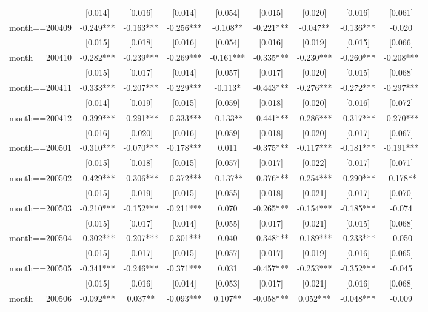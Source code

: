 \documentclass[]{article}
\begin{document}
\begin{tabular}{lcccccccc}
 & [0.014] & [0.016] & [0.014] & [0.054] & [0.015] & [0.020] & [0.016] & [0.061] \\
month==200409 & -0.249*** & -0.163*** & -0.256*** & -0.108** & -0.221*** & -0.047** & -0.136*** & -0.020 \\
 & [0.015] & [0.018] & [0.016] & [0.054] & [0.016] & [0.019] & [0.015] & [0.066] \\
month==200410 & -0.282*** & -0.239*** & -0.269*** & -0.161*** & -0.335*** & -0.230*** & -0.260*** & -0.208*** \\
 & [0.015] & [0.017] & [0.014] & [0.057] & [0.017] & [0.020] & [0.015] & [0.068] \\
month==200411 & -0.333*** & -0.207*** & -0.229*** & -0.113* & -0.443*** & -0.276*** & -0.272*** & -0.297*** \\
 & [0.014] & [0.019] & [0.015] & [0.059] & [0.018] & [0.020] & [0.016] & [0.072] \\
month==200412 & -0.399*** & -0.291*** & -0.333*** & -0.133** & -0.441*** & -0.286*** & -0.317*** & -0.270*** \\
 & [0.016] & [0.020] & [0.016] & [0.059] & [0.018] & [0.020] & [0.017] & [0.067] \\
month==200501 & -0.310*** & -0.070*** & -0.178*** & 0.011 & -0.375*** & -0.117*** & -0.181*** & -0.191*** \\
 & [0.015] & [0.018] & [0.015] & [0.057] & [0.017] & [0.022] & [0.017] & [0.071] \\
month==200502 & -0.429*** & -0.306*** & -0.372*** & -0.137** & -0.376*** & -0.254*** & -0.290*** & -0.178** \\
 & [0.015] & [0.019] & [0.015] & [0.055] & [0.018] & [0.021] & [0.017] & [0.070] \\
month==200503 & -0.210*** & -0.152*** & -0.211*** & 0.070 & -0.265*** & -0.154*** & -0.185*** & -0.074 \\
 & [0.015] & [0.017] & [0.014] & [0.055] & [0.017] & [0.021] & [0.015] & [0.068] \\
month==200504 & -0.302*** & -0.207*** & -0.301*** & 0.040 & -0.348*** & -0.189*** & -0.233*** & -0.050 \\
 & [0.015] & [0.017] & [0.015] & [0.057] & [0.017] & [0.019] & [0.016] & [0.065] \\
month==200505 & -0.341*** & -0.246*** & -0.371*** & 0.031 & -0.457*** & -0.253*** & -0.352*** & -0.045 \\
 & [0.015] & [0.016] & [0.014] & [0.053] & [0.017] & [0.021] & [0.016] & [0.068] \\
month==200506 & -0.092*** & 0.037** & -0.093*** & 0.107** & -0.058*** & 0.052*** & -0.048*** & -0.009 \\

\end{tabular}
\end{document}
